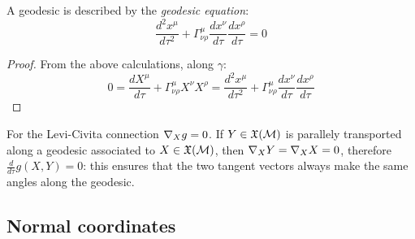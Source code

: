 \begin{proposition}
  A geodesic is described by the \textit{geodesic equation}:
  \begin{equation}
    \frac{d^2 x^\mu}{d\tau^2} + \Gamma^\mu_{\nu \rho} \frac{dx^\nu}{d\tau} \frac{dx^\rho}{d\tau} = 0
    \label{eq:3.53}
  \end{equation}
\end{proposition}
\begin{proof}
  From the above calculations, along $ \gamma $:
  \begin{equation*}
    0 = \frac{dX^\mu}{d\tau} + \Gamma^\mu_{\nu \rho} X^\nu X^\rho = \frac{d^2 x^\mu}{d\tau^2} + \Gamma^\mu_{\nu \rho} \frac{dx^\nu}{d\tau} \frac{dx^\rho}{d\tau}
  \end{equation*}
\end{proof}

For the Levi-Civita connection $ \nabla_X g = 0 $. If $ Y \in \mathfrak{X}(\mathcal{M}) $ is parallely transported along a geodesic associated to $ X \in \mathfrak{X}(\mathcal{M}) $, then $ \nabla_X Y = \nabla_X X = 0 $, therefore $ \frac{d}{d\tau} g(X,Y) = 0 $: this ensures that the two tangent vectors always make the same angles along the geodesic.

\subsection{Normal coordinates}










